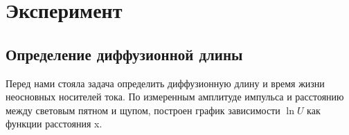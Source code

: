 







\section{Эксперимент}
\subsection{Определение диффузионной длины}
Перед нами стояла задача определить диффузионную длину и время жизни неосновных носителей тока. По измеренным амплитуде импульса и расстоянию между световым пятном и щупом, построен график зависимости $\ln{U}$ как функции расстояния x.

